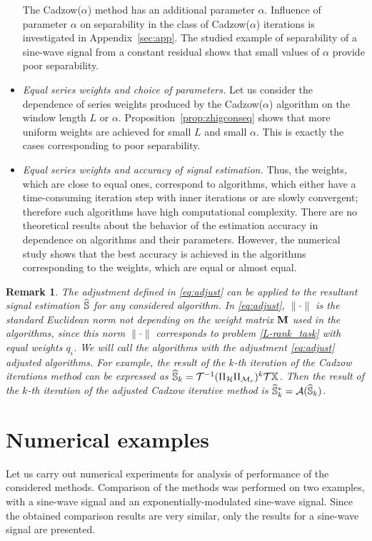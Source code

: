 \documentclass[sii]{ipart}
\newtheorem{remark}{Remark}
\begin{document}
\begin{itemize}
The Cadzow($\alpha$) method has an additional parameter $\alpha$.
Influence of parameter $\alpha$ on separability in the class of Cadzow($\alpha$) iterations is investigated in Appendix~\ref{sec:app}.
 The studied example of separability of a sine-wave signal from a constant residual shows that small values of $\alpha$ provide poor separability.
        \item \textit{Equal series weights and choice of parameters.}
        Let us consider the dependence of series weights produced by the Cadzow($\alpha$) algorithm on the window length $L$ or $\alpha$. Proposition~\ref{prop:zhigconseq} shows that more uniform weights are achieved for small $L$ and small $\alpha$. This is exactly
        the cases corresponding to poor separability.
 		\item \textit{Equal series weights and accuracy of signal estimation.}
 Thus, the weights, which are close to equal ones, correspond to algorithms, which either have a time-consuming iteration step with inner iterations or are slowly convergent; therefore such algorithms have high computational complexity.
There are no theoretical results about the behavior of the estimation accuracy in dependence on algorithms and their parameters. However, the numerical study shows that the best accuracy is achieved in the algorithms corresponding to the weights, which are equal or almost equal.	 \end{itemize}
	
	\begin{remark}
		\label{rem:adjust}
		The adjustment defined in \eqref{eq:adjust} can be applied to the resultant signal estimation $\widehat{\mathbb{S}}$ for any considered algorithm. In \eqref{eq:adjust}, $\|\cdot\|$ is the standard Euclidean norm not depending on the weight matrix $\mathbf{M}$ used in the algorithms, since this norm $\|\cdot\|$ corresponds to problem \eqref{L-rank_task} with equal weights $q_i$. We will call the algorithms with the adjustment \eqref{eq:adjust} adjusted algorithms. For example, the result of the $k$-th iteration of the Cadzow iterations method can be expressed as $\widehat{\mathbb{S}}_k = \mathcal{T}^{-1}(\Pi_{\mathcal{H}} \Pi_{\mathcal{M}_r})^k \mathcal{T} \mathbb{X}$. Then the result of the $k$-th iteration of the adjusted Cadzow iterative method is $\widehat{\mathbb{S}}_k^*=\mathcal{A}(\widehat{\mathbb{S}}_k)$.
	\end{remark}

\section{Numerical examples}
\label{sec:simul}
Let us carry out numerical experiments for analysis of performance of the considered methods. Comparison of the methods was performed on two examples, with a sine-wave signal and an exponentially-modulated sine-wave signal.
Since the obtained comparison results are very similar, only the results for a sine-wave signal are presented.
\end{document}

